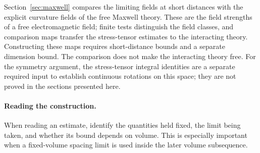 Section~\ref{sec:maxwell} compares the limiting fields at short distances with the explicit curvature fields of the free Maxwell theory.
These are the field strengths of a free electromagnetic field; finite tests distinguish the field classes, and comparison maps transfer the stress-tensor estimates to the interacting theory.
Constructing these maps requires short-distance bounds and a separate dimension bound.
The comparison does not make the interacting theory free.
For the symmetry argument, the stress-tensor integral identities are a separate required input to establish continuous rotations on this space; they are not proved in the sections presented here.

\paragraph{Reading the construction.}
When reading an estimate, identify the quantities held fixed, the limit being taken, and whether its bound depends on volume.
This is especially important when a fixed-volume spacing limit is used inside the later volume subsequence.

